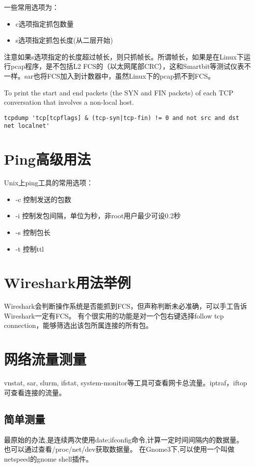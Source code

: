 一些常用选项为：
\begin{itemize}
    \item 
        c选项指定抓包数量
    \item 
        s选项指定抓包长度(从二层开始)
\end{itemize}

注意如果s选项指定的长度超过帧长，则只抓帧长。所谓帧长，如果是在Linux下运行pcap程序，是不包括L2 FCS的（以太网尾部CRC），这和Smartbit等测试仪表不一样。sar也将FCS加入到计数器中，虽然Linux下的pcap抓不到FCS。



 To print the start and end packets (the SYN and FIN packets) of each TCP conversation that involves a non-local host.
\begin{verbatim}
tcpdump 'tcp[tcpflags] & (tcp-syn|tcp-fin) != 0 and not src and dst net localnet'
\end{verbatim}



\section{Ping高级用法}
Unix上ping工具的常用选项：
\begin{itemize}
    \item 
        -c 控制发送的包数
    \item 
        -i 控制发包间隔，单位为秒，非root用户最少可设0.2秒
    \item 
        -s 控制包长
    \item 
        -t 控制ttl
\end{itemize}


\section{Wireshark用法举例}
Wireshark会判断操作系统是否能抓到FCS，但声称判断未必准确，可以手工告诉Wireshark一定有FCS。
有个很实用的功能是对一个包右键选择follow tcp connection，能够筛选出该包所属连接的所有包。


\section{网络流量测量}
vnstat, sar, slurm, ifstat, system-monitor等工具可查看网卡总流量。iptraf，iftop可查看连接的流量。

\subsection{简单测量}
最原始的办法,是连续两次使用date;ifconfig命令,计算一定时间间隔内的数据量。
也可以通过查看/proc/net/dev获取数据量。
在Gnome3下,可以使用一个叫做netspeed的gnome shell插件。

